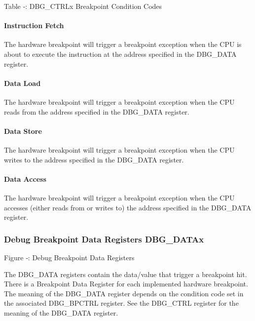 Table ‑: DBG\_CTRLx Breakpoint Condition Codes

\paragraph{Instruction Fetch}\label{instruction-fetch}

The hardware breakpoint will trigger a breakpoint exception when the CPU
is about to execute the instruction at the address specified in the
DBG\_DATA register.

\paragraph{Data Load}\label{data-load}

The hardware breakpoint will trigger a breakpoint exception when the CPU
reads from the address specified in the DBG\_DATA register.

\paragraph{Data Store}\label{data-store}

The hardware breakpoint will trigger a breakpoint exception when the CPU
writes to the address specified in the DBG\_DATA register.

\paragraph{Data Access}\label{data-access}

The hardware breakpoint will trigger a breakpoint exception when the CPU
accesses (either reads from or writes to) the address specified in the
DBG\_DATA register.

\subsubsection{Debug Breakpoint Data Registers
DBG\_DATAx}\label{debug-breakpoint-data-registers-dbg_datax}

\missingfigure{}

Figure ‑: Debug Breakpoint Data Registers

The DBG\_DATA registers contain the data/value that trigger a breakpoint
hit. There is a Breakpoint Data Register for each implemented hardware
breakpoint. The meaning of the DBG\_DATA register depends on the
condition code set in the associated DBG\_BPCTRL register. See the
DBG\_CTRL register for the meaning of the DBG\_DATA register.